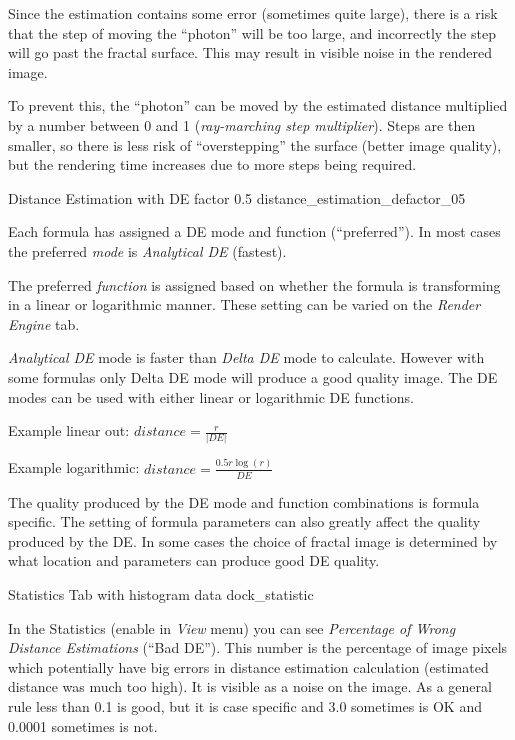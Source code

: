 Since the estimation contains some error (sometimes quite large), there is a
risk that the step of moving the ``photon'' will be too large, and incorrectly the step will go past the fractal surface. This may result in visible noise in the rendered image.

To prevent this, the ``photon'' can be moved by the estimated distance multiplied by a number between 0 and 1 (\emph{ray-marching step multiplier}). Steps are then smaller, so there is less risk of ``overstepping'' the surface (better image quality), but the rendering time increases due to more steps being required.

\nopagebreak

{Distance Estimation with DE factor 0.5}
{distance_estimation_defactor_05}

Each formula has assigned a DE mode and function (``preferred''). In most cases
the preferred \emph{mode} is \emph{Analytical DE} (fastest).

The preferred \emph{function} is assigned based on whether the formula is
transforming in a linear or logarithmic manner. These setting can be varied on
the \emph{Render Engine} tab.

\emph{Analytical DE} mode is faster than \emph{Delta DE} mode to calculate.
However with some formulas only Delta DE mode will produce a good quality image.
The DE modes can be used with either linear or logarithmic DE functions.

Example linear out: $ distance = \frac{r}{\lvert DE \rvert} $

Example logarithmic: $ distance = \frac{0.5 r  \log(r)}{DE} $

The quality produced by the DE mode and function combinations is formula
specific. The setting of formula parameters can also greatly affect the quality
produced by the DE. In some cases the choice of fractal image is determined by
what location and parameters can produce good DE quality.

\nopagebreak

{Statistics Tab with histogram data}
{dock_statistic}

In the Statistics (enable in \emph{View} menu) you can see \emph{Percentage of
	Wrong Distance Estimations} (``Bad DE''). This number is the percentage of image
pixels which potentially have big errors in distance estimation calculation
(estimated distance was much too high). It is visible as a noise on the image.
As a general rule less than 0.1 is good, but it is case specific and 3.0
sometimes is OK and 0.0001 sometimes is not.

